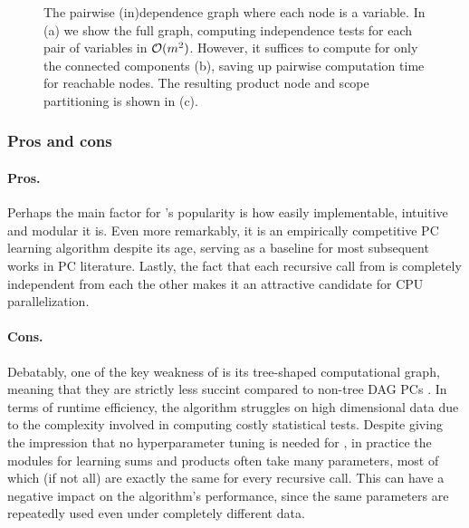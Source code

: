 \begin{figure}[t]
\begin{subfigure}[t]{0.3\textwidth}
    \caption{}
  \end{subfigure}
  \caption{The pairwise (in)dependence graph where each node is a variable. In (a) we show the full
    graph, computing independence tests for each pair of variables in $\mathcal{O}(m^2)$. However, it
    suffices to compute for only the connected components (b), saving up pairwise computation time
    for reachable nodes.  The resulting product node and scope partitioning is shown in (c).}
  \label{fig:indepgraph}
\end{figure}

\subsubsection{Pros and cons}

\paragraph{Pros.} Perhaps the main factor for 's popularity is how easily
implementable, intuitive and modular it is. Even more remarkably, it is an empirically competitive
PC learning algorithm despite its age, serving as a baseline for most subsequent works in PC
literature. Lastly, the fact that each recursive call from  is completely
independent from each the other makes it an attractive candidate for CPU parallelization.

\paragraph{Cons.} Debatably, one of the key weakness of  is its tree-shaped
computational graph, meaning that they are strictly less succint compared to non-tree DAG PCs
\citep{martens14}. In terms of runtime efficiency, the algorithm struggles on high dimensional
data due to the complexity involved in computing costly statistical tests. Despite
 giving the impression that no hyperparameter tuning is needed for
, in practice the modules for learning sums and products often take many
parameters, most of which (if not all) are exactly the same for every recursive call. This can have
a negative impact on the algorithm's performance, since the same parameters are repeatedly used
even under completely different data.


